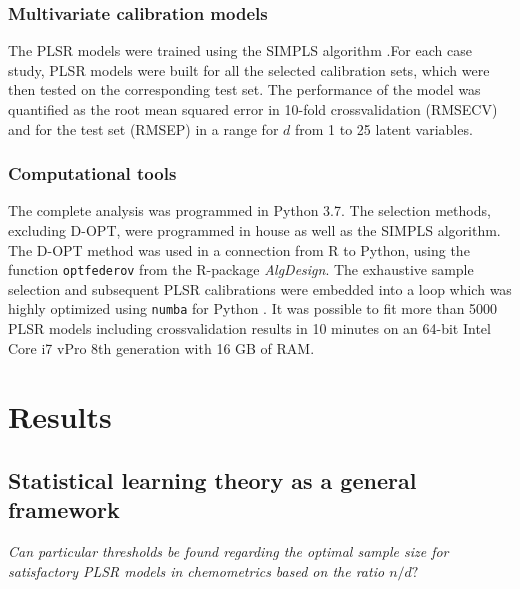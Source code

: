 \documentclass[journal=ancham,manuscript=article]{achemso}
\begin{document}
\subsubsection{Multivariate calibration models}

The PLSR models were trained using the SIMPLS algorithm \cite{DeJong1993}.For each case study, PLSR models were built for all the selected calibration sets, which were then tested on the corresponding test set. The performance of the model was quantified as the root mean squared error in 10-fold crossvalidation (RMSECV) and for the test set (RMSEP) in a range for $d$ from 1 to 25 latent variables. 

\subsubsection{Computational tools}

The complete analysis was programmed in Python 3.7. The selection methods, excluding D-OPT, were programmed in house as well as the SIMPLS algorithm. The D-OPT method was used in a connection from R to Python, using the function \texttt{optfederov} from the R-package \emph{AlgDesign}\cite{Wheeler2019}. The exhaustive sample selection and subsequent PLSR calibrations were embedded into a loop which was highly optimized using \texttt{numba} for Python \cite{Lam2015}. It was possible to fit more than 5000 PLSR models including crossvalidation results in 10 minutes on an 64-bit Intel Core i7 vPro 8th generation with 16 GB of RAM. 



\section*{Results}\label{results}

\subsection*{Statistical learning theory as a general framework}\label{results:genframework}

\emph{Can particular thresholds be found regarding the optimal sample size for satisfactory PLSR models in chemometrics based on the ratio $n/d?$}
\end{document}
